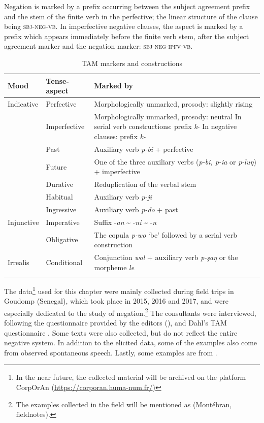 \documentclass[output=paper,colorlinks,citecolor=brown]{langscibook}
\begin{document}
Negation is marked by a prefix occurring between the subject agreement prefix and the stem of the finite verb in the perfective; the linear structure of the clause being \textsc{sbj-neg-vb}. In imperfective negative clauses, the aspect is marked by a prefix which appears immediately before the finite verb stem, after the subject agreement marker and the negation marker: \textsc{sbj-neg-ipfv{}-vb}.

\begin{table}
\begin{tabularx}{\textwidth}{llX}
\lsptoprule
Mood & Tense-aspect & Marked by \\
\midrule
Indicative & Perfective & Morphologically unmarked, prosody: slightly rising\\
& Imperfective & Morphologically unmarked, prosody: neutral \newline 
    In serial verb constructions: prefix \textit{k}{}- \newline
    In negative clauses: prefix \textit{k-}\\
&  Past & Auxiliary verb \textit{p-bi} + perfective\\
&  Future & One of the three auxiliary verbs (\textit{p-bi, p-ia} or \textit{p-luŋ}) + imperfective\\
& Durative & Reduplication of the verbal stem\\
& Habitual & Auxiliary verb \textit{p-ji}\\
& Ingressive & Auxiliary verb \textit{p-do} + past\\  
\midrule
Injunctive & Imperative & Suffix -\textit{an} {\textasciitilde} -\textit{ni} {\textasciitilde} -\textit{n}\\
& Obligative & The copula \textit{p-wo} ‘be’ followed by a serial verb construction\\
\midrule
Irrealis & Conditional & Conjunction \textit{wol} + auxiliary verb \textit{p-şaŋ} or the morpheme \textit{le}\\
\lspbottomrule
\end{tabularx}
\caption{TAM markers and constructions}
\label{tab:mank:1}
\end{table}

The data\footnote{In the near future, the collected material will be archived on the platform CorpOrAn (\url{https://corporan.huma-num.fr/})}  used for this chapter were mainly collected during field trips in Goudomp (Senegal), which took place in 2015, 2016 and 2017, and were especially dedicated to the study of negation.\footnote{The examples collected in the field will be mentioned as (Montébran, fieldnotes).} The consultants were interviewed, following the questionnaire provided by the editors (),
and Dahl’s TAM questionnaire \citep{Dahl2000}.
Some texts were also collected, but do not reflect the entire negative system. In addition to the elicited data, some of the examples also come from observed spontaneous speech. Lastly, some examples are from \citet{Gaved2004,Gaved2007,Gaved2020}.
\end{document}
